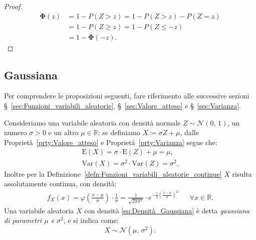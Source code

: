             \begin{proof}
                \hfill
                \begin{align*}
                    \mathbf{\Phi}(z) &= 1 - P(Z > z) = 1 - P(Z > z) - P(Z = z) \\
                                     &= 1 - P(Z \geq z) = 1 - P(Z \leq -z) \\
                                     &= 1 - \mathbf{\Phi}(-z)
                .\end{align*}
            \end{proof}
        \subsection{Gaussiana}
            \begin{note}
                Per comprendere le proposizioni seguenti, fare riferimento alle successive sezioni §~\ref{sec:Funzioni_variabili_aleatorie}, §~\ref{sec:Valore_atteso} e §~\ref{sec:Varianza}.
            \end{note}
            \begin{defn}\label{defn:Gaussiana}
                Consideriamo una variabile aleatoria con densità normale $Z \sim \mathcal{N}(0,\,1)$, un numero $\sigma > 0$ e un altro $\mu \in \mathbb{R}$; se definiamo $X \coloneqq \sigma Z + \mu$, dalle Proprietà~\ref{prty:Valore_atteso} e Proprietà~\ref{prty:Varianza} segue che:
                \begin{gather*}
                    \text{E}(X) = \sigma \cdot \text{E}(Z) + \mu = \mu, \\
                    \text{Var}(X) = \sigma^2 \cdot \text{Var}(Z) = \sigma^2
                .\end{gather*}
                Inoltre per la Definizione~\ref{defn:Funzioni_variabili_aleatorie_continue} $X$ risulta assolutamente continua, con densità:
                \begin{align}\label{eq:Densità_Gaussiana}
                    f_X(x) = \varphi \left(\frac{x-\mu}{\sigma}\right)\cdot \frac{1}{\sigma} = \frac{1}{\sqrt{2\pi\sigma^2}} \cdot e^{-\frac{1}{2}\left(\frac{x-\mu}{\sigma}\right)^2} & & \forall x \in \mathbb{R}
                .\end{align}
                Una variabile aleatoria $X$ con densità \eqref{eq:Densità_Gaussiana} è detta \emph{gaussiana di parametri $\mu$ e $\sigma^2$}, e si indica come: \[
                    X \sim \mathcal{N}(\mu,\,\sigma^2)
                .\] 
            \end{defn}
